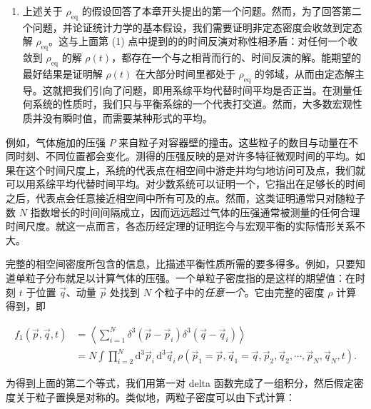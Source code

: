 \begin{enumerate}[itemsep=0.5em,topsep=0.4em,start=3]
  \item 上述关于 $\rho_{\text{eq}}$ 的假设回答了本章开头提出的第一个问题。然而，为了回答第二个问题，并论证统计力学的基本假设，我们需要证明非定态密度会收敛到定态解 $\rho_{\text{eq}}$。这与上面第 (1) 点中提到的的时间反演对称性相矛盾：对任何一个收敛到 $\rho_{\text{eq}}$ 的解 $\rho(t)$，都存在一个与之相背而行的、时间反演的解。能期望的最好结果是证明解 $\rho(t)$ 在大部分时间里都处于 $\rho_{\text{eq}}$ 的邻域，从而由定态解主导。这就把我们引向了问题，即用系综平均代替时间平均是否正当。在测量任何系统的性质时，我们只与平衡系综的一个代表打交道。然而，大多数宏观性质并没有瞬时值，而需要某种形式的平均。
\end{enumerate}

例如，气体施加的压强 $P$ 来自粒子对容器壁的撞击。这些粒子的数目与动量在不同时刻、不同位置都会变化。测得的压强反映的是对许多特征微观时间的平均。如果在这个时间尺度上，系统的代表点在相空间中游走并均匀地访问可及点，我们就可以用系综平均代替时间平均。对少数系统可以证明一个，它指出在足够长的时间之后，代表点会任意接近相空间中所有可及的点。然而，这类证明通常只对随粒子数 $N$ 指数增长的时间间隔成立，因而远远超过气体的压强通常被测量的任何合理时间尺度。就这一点而言，各态历经定理的证明迄今与宏观平衡的实际情形关系不大。


完整的相空间密度所包含的信息，比描述平衡性质所需的要多得多。例如，只要知道单粒子分布就足以计算气体的压强。一个单粒子密度指的是这样的期望值：在时刻 $t$ 于位置 $\vec q$、动量 $\vec p$ 处找到 $N$ 个粒子中的\emph{任意一个}。它由完整的密度 $\rho$ 计算得到，即

\begin{equation}\label{eq:3.16}
  \begin{aligned}
    f_1(\vec p,\vec q,t)&=\left\langle\sum_{i=1}^N\delta^3(\vec p-\vec p_i)\delta^3(\vec q-\vec q_i)\right\rangle\\
    &=N\int\prod_{i=2}^N \mathrm{d}^3\vec p_i\,\mathrm{d}^3\vec q_i\,\rho(\vec p_1=\vec p,\vec q_1=\vec q,\vec p_2,\vec q_2,\cdots,\vec p_N,\vec q_N,t).
  \end{aligned}
\end{equation}

为得到上面的第二个等式，我们用第一对 delta 函数完成了一组积分，然后假定密度关于粒子置换是对称的。类似地，两粒子密度可以由下式计算：

